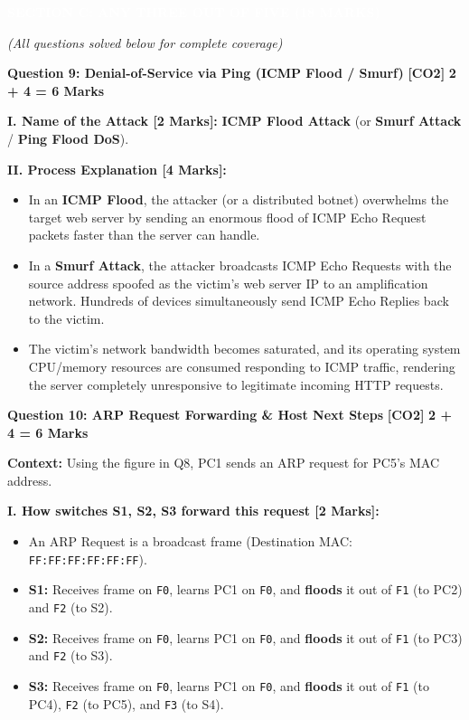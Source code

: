 \documentclass[11pt,a4paper]{article}
\newcommand{\questionheader}[3]{
    \vspace{0.35cm}
    \noindent\colorbox{qboxbg}{
        \parbox{\dimexpr\textwidth-2\fboxsep\relax}{
            \textbf{\textcolor{primary}{\large #1}} \hfill \textbf{\textcolor{accent}{[#2]}} \hfill \textbf{\textcolor{secondary}{#3 Marks}}
        }
    }
    \vspace{0.15cm}
}
\newcommand{\sectionbanner}[1]{
    \vspace{0.5cm}
    \noindent\colorbox{primary}{
        \parbox{\dimexpr\textwidth-2\fboxsep\relax}{
            \centering \textbf{\textcolor{white}{\Large #1}}
        }
    }
    \vspace{0.25cm}
}
\begin{document}
\newpage
\sectionbanner{SECTION C: ANY THREE OUT OF FIVE (18 MARKS)}
\textit{(All questions solved below for complete coverage)}

\questionheader{Question 9: Denial-of-Service via Ping (ICMP Flood / Smurf)}{CO2}{2 + 4 = 6}

\textbf{I. Name of the Attack [2 Marks]:}
\textbf{ICMP Flood Attack} (or \textbf{Smurf Attack} / \textbf{Ping Flood DoS}).

\textbf{II. Process Explanation [4 Marks]:}
\begin{itemize}
    \item In an \textbf{ICMP Flood}, the attacker (or a distributed botnet) overwhelms the target web server by sending an enormous flood of ICMP Echo Request packets faster than the server can handle.
    \item In a \textbf{Smurf Attack}, the attacker broadcasts ICMP Echo Requests with the source address spoofed as the victim's web server IP to an amplification network. Hundreds of devices simultaneously send ICMP Echo Replies back to the victim.
    \item The victim's network bandwidth becomes saturated, and its operating system CPU/memory resources are consumed responding to ICMP traffic, rendering the server completely unresponsive to legitimate incoming HTTP requests.
\end{itemize}

\questionheader{Question 10: ARP Request Forwarding \& Host Next Steps}{CO2}{2 + 4 = 6}

\textbf{Context:} Using the figure in Q8, PC1 sends an ARP request for PC5's MAC address.

\textbf{I. How switches S1, S2, S3 forward this request [2 Marks]:}
\begin{itemize}
    \item An ARP Request is a broadcast frame (Destination MAC: \texttt{FF:FF:FF:FF:FF:FF}).
    \item \textbf{S1:} Receives frame on \texttt{F0}, learns PC1 on \texttt{F0}, and \textbf{floods} it out of \texttt{F1} (to PC2) and \texttt{F2} (to S2).
    \item \textbf{S2:} Receives frame on \texttt{F0}, learns PC1 on \texttt{F0}, and \textbf{floods} it out of \texttt{F1} (to PC3) and \texttt{F2} (to S3).
    \item \textbf{S3:} Receives frame on \texttt{F0}, learns PC1 on \texttt{F0}, and \textbf{floods} it out of \texttt{F1} (to PC4), \texttt{F2} (to PC5), and \texttt{F3} (to S4).
\end{itemize}
\end{document}
